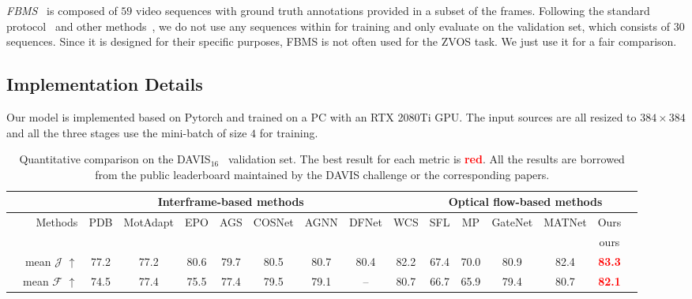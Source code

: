 \documentclass[sigconf]{acmart}
\newcommand{\textBC}[2]{\textbf{\textcolor{#1}{#2}}}
\begin{document}
\emph{FBMS}~\cite{FBMS} is composed of $59$ video sequences with ground truth annotations provided in a subset of the frames. Following the standard protocol~\cite{LVO} and other methods~\cite{MATNet,PDB}, we do not use any sequences within for training and only evaluate on the validation set, which consists of $30$ sequences. Since it is designed for their specific purposes, FBMS is not often used for the ZVOS task. We just use it for a fair comparison.
\subsection{Implementation Details}
Our model is implemented based on Pytorch and trained on a PC with an RTX 2080Ti GPU. The input sources are all resized to $384 \times 384$ and all the three stages use the  mini-batch of size $4$ for training.
\begin{table*}
	\small
	\centering
	\caption{Quantitative comparison on the DAVIS$_{16}$~\cite{davis16} validation set.
		The best result for each metric is \textBC{red}{red}.
		All the results are borrowed from the public leaderboard maintained by the DAVIS challenge or the corresponding papers.}
\resizebox{0.9\textwidth}{!} {
	\begin{tabular}{cr||cccccccc||cccccc}
	   \toprule[1pt]
& & &\multicolumn{5}{c}{Interframe-based methods}&&&\multicolumn{5}{c}{Optical flow-based methods} \\ \hline
		& Methods  &PDB  &MotAdapt  & EPO &AGS & COSNet  & AGNN & DFNet & WCS & SFL  & MP& GateNet&MATNet &Ours \\ 
		& &~\cite{PDB}&~\cite{MotAdapt}&~\cite{EPO}&~\cite{AGS}&\cite{COSNet}&~\cite{AGNN}&~\cite{DFNet}&~\cite{WCS}&~\cite{SFL}&~\cite{MP}&~\cite{GateNet}&~\cite{MATNet}&ours\\
		\hline \hline
		& mean $\mathcal{J}$ $\uparrow$   &77.2  &77.2  &80.6  &79.7  &80.5  & 80.7& 80.4 &82.2 &67.4  & 70.0 & 80.9 &82.4 & \textBC{red}{83.3}   \\
\hline
		& mean $\mathcal{F}$ $\uparrow$   &74.5  &77.4  &75.5  &77.4  &79.5  & 79.1 & -- & 80.7 & 66.7  &65.9  & 79.4  &80.7 & \textBC{red}{82.1} \\
\bottomrule[1pt]
	\end{tabular}
	}
	\label{table:Table1}
\end{table*}
\end{document}
